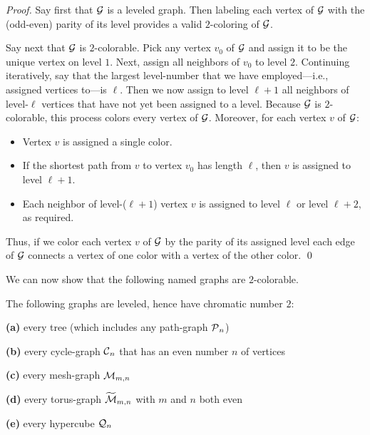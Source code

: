 \begin{proof}
Say first that $\mbox{$\cal G$}$ is a leveled graph.  Then labeling each vertex of $\mbox{$\cal G$}$ with the (odd-even) parity of its level provides a valid $2$-coloring of $\mbox{$\cal G$}$.

\medskip


Say next that $\mbox{$\cal G$}$ is $2$-colorable.  Pick any vertex $v_0$ of $\mbox{$\cal G$}$ and assign it to be the unique vertex on level $1$.  Next, assign all neighbors of $v_0$ to level $2$.  Continuing iteratively, say that the largest level-number that we have employed---i.e., assigned vertices to---is $\ell$.  Then we now assign to level $\ell +1$ all neighbors of level-$\ell$ vertices that have not yet been assigned to a level.  Because $\mbox{$\cal G$}$ is $2$-colorable, this process colors every vertex of $\mbox{$\cal G$}$.  Moreover, for each vertex $v$ of $\mbox{$\cal G$}$:
\begin{itemize}
\item
Vertex $v$ is assigned a single color.
\item
If the shortest path from $v$ to vertex $v_0$ has length $\ell$, then $v$ is assigned to level $\ell+1$.
\item
Each neighbor of level-($\ell+1$) vertex $v$ is assigned to level $\ell$ or level $\ell+2$, as required.
\end{itemize}
Thus, if we color each vertex $v$ of $\mbox{$\cal G$}$ by the parity of its assigned level each edge of $\mbox{$\cal G$}$ connects a vertex of one color with a vertex of the other color.  \qed
\end{proof}

We can now show that the following named graphs are $2$-colorable.

\begin{corol}
\label{thm:list-2-colorables}
The following graphs are leveled, hence have chromatic number $2$:

\smallskip

{\bf (a)}
every tree (which includes any path-graph $\mbox{$\cal P$}_n$)

\smallskip

{\bf (b)}
every cycle-graph $\mbox{$\cal C$}_n$ that has an even number $n$ of vertices

\smallskip

{\bf (c)}
every mesh-graph $\mbox{$\cal M$}_{m,n}$

\smallskip

{\bf (d)}
every torus-graph $\widetilde{\mbox{$\cal M$}}_{m,n}$ with $m$ and $n$ both even
\smallskip

{\bf (e)}
every hypercube $\mbox{$\cal Q$}_n$
\end{corol}

